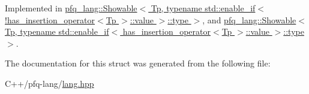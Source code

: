 Implemented in \hyperlink{structpfq__lang_1_1Showable_3_01Tp_00_01typename_01std_1_1enable__if_3_9has__insertion__operator488b85264b5317ebf7312bb7e4c18409_a52c1fe66b7314c0f28d5a1137be24652}{pfq\+\_\+lang\+::\+Showable$<$ Tp, typename std\+::enable\+\_\+if$<$!has\+\_\+insertion\+\_\+operator$<$\+Tp $>$\+::value $>$\+::type $>$}, and \hyperlink{structpfq__lang_1_1Showable_3_01Tp_00_01typename_01std_1_1enable__if_3_01has__insertion__operato0cfb72d444f463b2d87a78275e86feaa_a59c99f84a35116f3f03e63164c65258f}{pfq\+\_\+lang\+::\+Showable$<$ Tp, typename std\+::enable\+\_\+if$<$ has\+\_\+insertion\+\_\+operator$<$\+Tp $>$\+::value $>$\+::type $>$}.



The documentation for this struct was generated from the following file\+:\begin{DoxyCompactItemize}
\item 
C++/pfq-\/lang/\hyperlink{lang_8hpp}{lang.\+hpp}\end{DoxyCompactItemize}
